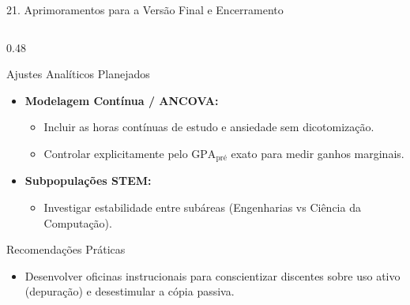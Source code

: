 \documentclass[aspectratio=169, 10pt]{beamer}
\begin{document}
\begin{frame}{21. Aprimoramentos para a Versão Final e Encerramento}
    \begin{columns}[T]
        \begin{column}{0.48\textwidth}
            \begin{block}{Ajustes Analíticos Planejados}
                \begin{itemize}\setlength{\itemsep}{5pt}\small
                    \item \textbf{Modelagem Contínua / ANCOVA:}
                    \begin{itemize}\footnotesize
                        \item Incluir as horas contínuas de estudo e ansiedade sem dicotomização.
                        \item Controlar explicitamente pelo $\text{GPA}_{\text{pré}}$ exato para medir ganhos marginais.
                    \end{itemize}
                    \item \textbf{Subpopulações STEM:}
                    \begin{itemize}\footnotesize
                        \item Investigar estabilidade entre subáreas (Engenharias vs Ciência da Computação).
                    \end{itemize}
                \end{itemize}
            \end{block}

            \begin{block}{Recomendações Práticas}
                \begin{itemize}\footnotesize
                    \item Desenvolver oficinas instrucionais para conscientizar discentes sobre uso ativo (depuração) e desestimular a cópia passiva.
                \end{itemize}
            \end{block}
        \end{column}


\end{columns}
\end{frame}
\end{document}
